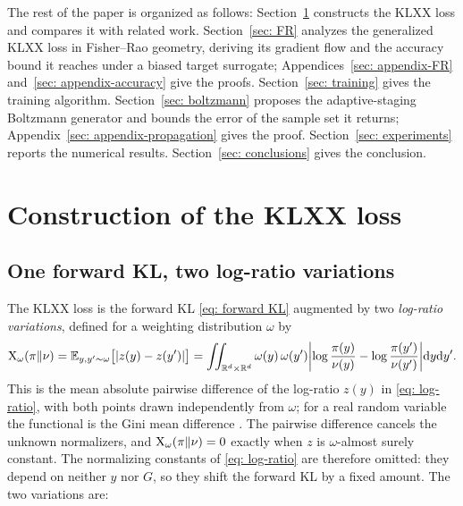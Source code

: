 \documentclass{article}
\begin{document}
The rest of the paper is organized as follows:
Section~\ref{sec: construction} constructs the KLXX loss and compares it with related work. Section~\ref{sec: FR} analyzes the generalized KLXX loss in Fisher--Rao geometry, deriving its gradient flow and the accuracy bound it reaches under a biased target surrogate; Appendices~\ref{sec: appendix-FR} and~\ref{sec: appendix-accuracy} give the proofs. Section~\ref{sec: training} gives the training algorithm. Section~\ref{sec: boltzmann} proposes the adaptive-staging Boltzmann generator and bounds the error of the sample set it returns; Appendix~\ref{sec: appendix-propagation} gives the proof. Section~\ref{sec: experiments} reports the numerical results. Section~\ref{sec: conclusions} gives the conclusion.


\section{Construction of the KLXX loss}
\label{sec: construction}

\subsection{One forward KL, two log-ratio variations}
\label{subsec: construction}

The KLXX loss is the forward KL \eqref{eq: forward KL} augmented by two \emph{log-ratio variations}, defined for a weighting distribution $\omega$ by
\begin{equation}
	\mathrm{X}_\omega(\pi\|\nu) = \mathbb E_{y,y'\sim \omega} \big[|z(y)-z(y')|\big] = \iint_{\mathbb R^d\times\mathbb R^d} \omega(y)\,\omega(y')
	\biggl|\log\frac{\pi(y)}{\nu(y)} - \log\frac{\pi(y')}{\nu(y')}\biggr| \mathrm{d} y\mathrm{d} y'.
	\label{eq: X}
\end{equation}
This is the mean absolute pairwise difference of the log-ratio $z(y)$ in \eqref{eq: log-ratio}, with both points drawn independently from $\omega$; for a real random variable the functional is the Gini mean difference \citep{yitzhaki2003gini}. The pairwise difference cancels the unknown normalizers, and $\mathrm{X}_\omega(\pi\|\nu)=0$ exactly when $z$ is $\omega$-almost surely constant. The normalizing constants of \eqref{eq: log-ratio} are therefore omitted: they depend on neither $y$ nor $G$, so they shift the forward KL by a fixed amount. The two variations are:
\end{document}
